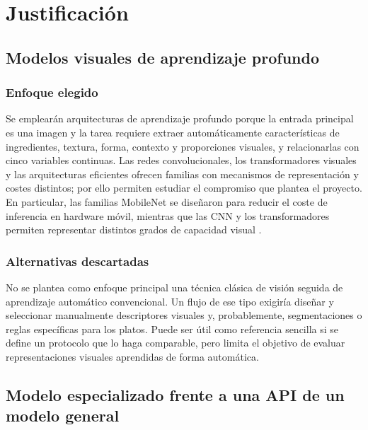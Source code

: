 \section{Justificación}

\subsection{Modelos visuales de aprendizaje profundo}

\subsubsection{Enfoque elegido}

Se emplearán arquitecturas de aprendizaje profundo porque la entrada principal
es una imagen y la tarea requiere extraer automáticamente características de
ingredientes, textura, forma, contexto y proporciones visuales, y relacionarlas
con cinco variables continuas. Las redes convolucionales, los transformadores
visuales y las arquitecturas eficientes ofrecen familias con mecanismos de
representación y costes distintos; por ello permiten estudiar el compromiso que
plantea el proyecto. En particular, las familias MobileNet se diseñaron para
reducir el coste de inferencia en hardware móvil, mientras que las CNN y los
transformadores permiten representar distintos grados de capacidad visual
\citep{sandlerMobileNetV2InvertedResiduals2019,howardSearchingMobileNetV32019,qinMobileNetV4UniversalModels2024,bianco2DPredictionNutritional2025}.

\subsubsection{Alternativas descartadas}

No se plantea como enfoque principal una técnica clásica de visión seguida de
aprendizaje automático convencional. Un flujo de ese tipo exigiría diseñar y
seleccionar manualmente descriptores visuales y, probablemente, segmentaciones
o reglas específicas para los platos. Puede ser útil como referencia sencilla
si se define un protocolo que lo haga comparable, pero limita el objetivo de
evaluar representaciones visuales aprendidas de forma automática.

\subsection{Modelo especializado frente a una API de un modelo general}

